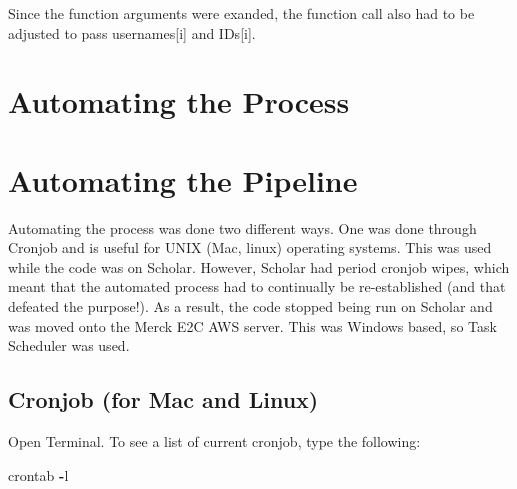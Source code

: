\documentclass[]{book}
\newenvironment{Shaded}{\begin{snugshade}}{\end{snugshade}}
\newcommand{\KeywordTok}[1]{\textcolor[rgb]{0.13,0.29,0.53}{\textbf{#1}}}
\newcommand{\DecValTok}[1]{\textcolor[rgb]{0.00,0.00,0.81}{#1}}
\newcommand{\SpecialCharTok}[1]{\textcolor[rgb]{0.00,0.00,0.00}{#1}}
\newcommand{\StringTok}[1]{\textcolor[rgb]{0.31,0.60,0.02}{#1}}
\newcommand{\CommentTok}[1]{\textcolor[rgb]{0.56,0.35,0.01}{\textit{#1}}}
\newcommand{\ControlFlowTok}[1]{\textcolor[rgb]{0.13,0.29,0.53}{\textbf{#1}}}
\newcommand{\OperatorTok}[1]{\textcolor[rgb]{0.81,0.36,0.00}{\textbf{#1}}}
\newcommand{\BuiltInTok}[1]{#1}
\newcommand{\NormalTok}[1]{#1}
\begin{document}
Since the function arguments were exanded, the function call also had to
be adjusted to pass usernames{[}i{]} and IDs{[}i{]}.

\begin{Shaded}
\end{Shaded}

\section{Automating the Process}\label{automating-the-process}

\section{Automating the Pipeline}\label{automating-the-pipeline}

Automating the process was done two different ways. One was done through
Cronjob and is useful for UNIX (Mac, linux) operating systems. This was
used while the code was on Scholar. However, Scholar had period cronjob
wipes, which meant that the automated process had to continually be
re-established (and that defeated the purpose!). As a result, the code
stopped being run on Scholar and was moved onto the Merck E2C AWS
server. This was Windows based, so Task Scheduler was used.

\subsection{Cronjob (for Mac and
Linux)}\label{cronjob-for-mac-and-linux}

Open Terminal. To see a list of current cronjob, type the following:

\begin{Shaded}
\begin{Highlighting}[]
\NormalTok{crontab }\OperatorTok{-}\NormalTok{l}
\end{Highlighting}
\end{Shaded}
\end{document}
